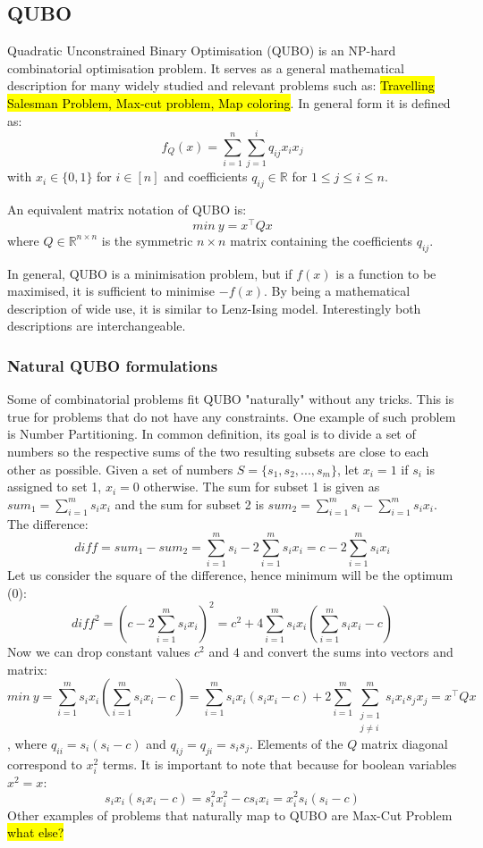 \subsection{QUBO}
Quadratic Unconstrained Binary Optimisation (QUBO) is an NP-hard combinatorial optimisation problem. It serves as a general mathematical description for many widely studied and relevant problems such as: \hl{Travelling Salesman Problem, Max-cut problem, Map coloring}.  In general form it is defined as:
\[f_Q(x) = \sum_{i=1}^n \sum_{j=1}^i q_{ij} x_i x_j\]
with $x_i\in\lbrace 0,1\rbrace$ for $i\in[n]$ and coefficients $q_{ij}\in\mathbb{R}$ for $1\leq j\leq i\leq n$.

An equivalent matrix notation of QUBO is:
\[ min\ y=x^\top Qx\]
where $Q\in\mathbb{R}^{n\times n}$ is the symmetric $n\times n$ matrix containing the coefficients $q_{ij}$.

In general, QUBO is a minimisation problem, but if $f(x)$ is a function to be maximised, it is sufficient to minimise $-f(x)$. By being a mathematical description of wide use, it is similar to Lenz-Ising model. Interestingly both descriptions are interchangeable.

\subsubsection{Natural QUBO formulations}
\label{subsub:natural_qubo}
Some of combinatorial problems fit QUBO "naturally" without any tricks. This is true for problems that do not have any constraints. One example of such problem is Number Partitioning. In common definition, its goal is to divide a set of numbers so the respective sums of the two resulting subsets are close to each other as possible. Given a set of numbers $S=\lbrace s_1,s_2,...,s_m\rbrace$, let $x_i=1$ if $s_i$ is assigned to set 1, $x_i=0$ otherwise. The sum for subset 1 is given as $sum_1=\sum_{i=1}^ms_ix_i$ and the sum for subset 2 is $sum_2=\sum_{i=1}^ms_i - \sum_{i=1}^ms_ix_i$. The difference:
\[diff=sum_1-sum_2=\sum_{i=1}^ms_i - 2\sum_{i=1}^ms_ix_i= c - 2\sum_{i=1}^ms_ix_i\]
Let us consider the square of the difference, hence minimum will be the optimum (0):
\[diff^2=\left(c - 2\sum_{i=1}^ms_ix_i\right)^2=c^2+4\sum_{i=1}^ms_ix_i\left(\sum_{i=1}^ms_ix_i-c\right)\]
Now we can drop constant values $c^2$ and $4$ and convert the sums into vectors and matrix:
\[min\ y =\sum_{i=1}^ms_ix_i\left(\sum_{i=1}^ms_ix_i-c\right)=
\sum_{i=1}^m s_i x_i(s_i x_i-c) + 2\sum_{i=1}^m \sum_{\substack{j=1 \\ j\ne i}}^m s_i x_i s_j x_j=
x^\top Qx\],
where $q_{ii}=s_i(s_i-c)$ and $q_{ij}=q_{ji}=s_is_j$. Elements of the $Q$ matrix diagonal correspond to $x_i^2$ terms. It is important to note that because for boolean variables $x^2=x$:
\[s_i x_i(s_i x_i-c) = s_i^2 x_i^2 - c s_i x_i = x_i^2 s_i(s_i - c)\]
Other examples of problems that naturally map to QUBO are Max-Cut Problem \hl{what else?}
